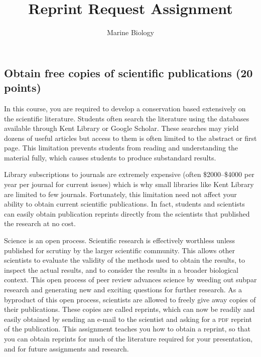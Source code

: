 \documentclass[12pt]{article}
\title{Reprint Request Assignment}
\author{Marine Biology}
\date{}                                           %
\begin{document}
\thispagestyle{plain}


\subsection*{Obtain free copies of scientific publications (20 points)}

In this course, you are required
to develop a conservation based extensively on the
scientific literature. Students often search the literature using the
databases available through Kent Library or Google Scholar. These
searches may yield dozens of useful  articles but access to them is often limited to the abstract or first page. This limitation
prevents students from reading and understanding the material fully, 
which causes students to produce substandard results.

Library subscriptions to journals are extremely expensive (often \$2000--\$4000
per year per journal for current issues) which is why small
libraries like Kent Library are limited to few journals.
Fortunately, this limitation need not affect your ability to obtain
current scientific publications. In fact, students and scientists can
easily obtain publication reprints directly from the scientists that
published the research at no cost.

Science is an open process. Scientific research is effectively worthless
unless published for scrutiny by the larger scientific community. This
allows other scientists to evaluate the validity of the methods used to
obtain the results, to inspect the actual results, and to consider the
results in a broader biological context. This open process of peer
review advances science by weeding out subpar research and generating
new and exciting questions for further research. As a byproduct of this
open process, scientists are allowed to freely give away copies of their
publications. These copies are called reprints, which can now be readily
and easily obtained by sending an e-mail to the scientist and asking for
a \textsc{pdf} reprint of the publication.  This assignment teaches you how to obtain a reprint, so that you can
obtain reprints for much of the literature required for your
presentation, and for future assignments and research.
\end{document}
